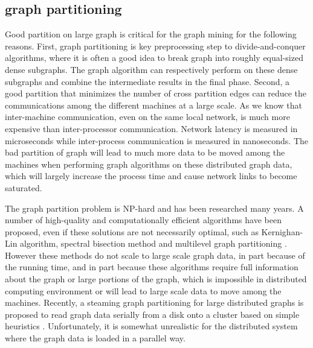 \documentclass{acm_proc_article-sp}
\begin{document}
\subsection{graph partitioning}
 Good partition on large graph is critical for the graph mining for the following reasons. First, graph partitioning is key preprocessing step to divide-and-conquer algorithms, where it is often a good idea to break graph into roughly equal-sized dense subgraphs. The graph algorithm can respectively perform on these dense subgraphs and combine the intermediate results in the final phase. Second, a good partition that minimizes the number of cross partition edges can reduce the communications among the different machines at a large scale. As we know that inter-machine communication, even on the same local network, is much more expensive than inter-processor communication. Network latency is measured in microseconds while inter-process communication is measured in nanoseconds. The bad partition of graph will lead to much more data to be moved among the machines when performing graph algorithms on these distributed graph data, which will largely increase the process time and cause network links to become saturated.
\par
 The graph partition problem is NP-hard and has been researched many years. A number of high-quality and computationally efficient algorithms have been proposed, even if these solutions are not necessarily optimal, such as Kernighan-Lin algorithm, spectral bisection method and multilevel graph partitioning \cite{kl:partition,barnard:mrsb,karypis:multi1}. However these methods do not scale to large scale graph data, in part because of the running time, and in part because these algorithms require full information about the graph or large portions of the graph, which is impossible in distributed computing environment or will lead to large scale data to move among the machines. Recently, a steaming graph partitioning for large distributed graphs is proposed to read graph data serially from a disk onto a cluster based on simple heuristics \cite{url:streaming}. Unfortunately, it is somewhat unrealistic for the distributed system where the graph data is loaded in a parallel way.
\end{document}
